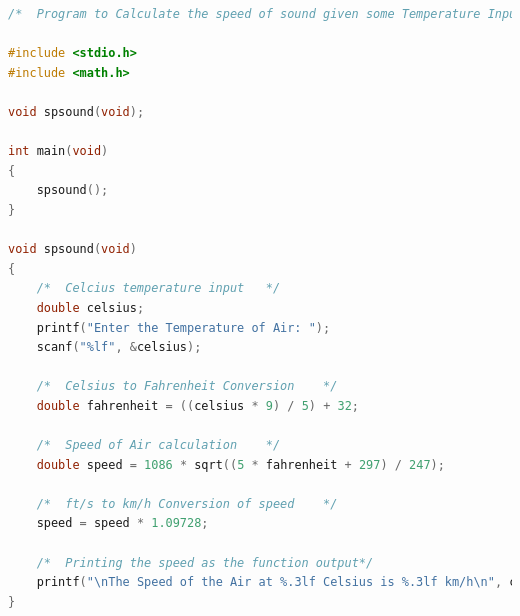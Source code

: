 			\begin{lstlisting}[language=C, caption=\textit{Speed of Sound Calculating Program}]	
/*  Program to Calculate the speed of sound given some Temperature Input    */

#include <stdio.h>
#include <math.h>

void spsound(void);

int main(void)
{
    spsound();
}

void spsound(void)
{
    /*  Celcius temperature input   */
    double celsius;
    printf("Enter the Temperature of Air: ");
    scanf("%lf", &celsius);

    /*  Celsius to Fahrenheit Conversion    */
    double fahrenheit = ((celsius * 9) / 5) + 32;

    /*  Speed of Air calculation    */
    double speed = 1086 * sqrt((5 * fahrenheit + 297) / 247);

    /*  ft/s to km/h Conversion of speed    */
    speed = speed * 1.09728;

    /*  Printing the speed as the function output*/
    printf("\nThe Speed of the Air at %.3lf Celsius is %.3lf km/h\n", celsius, speed);
}




		\end{lstlisting}
